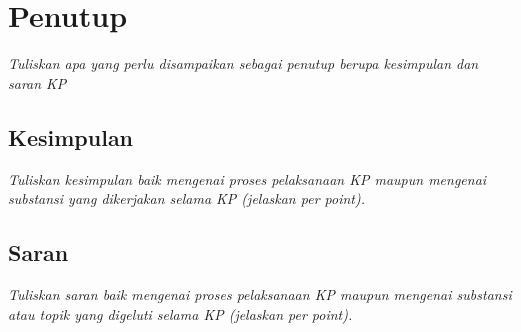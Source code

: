 \chapter{Penutup}
\textit{Tuliskan apa yang perlu disampaikan sebagai penutup berupa kesimpulan dan saran KP}

\section{Kesimpulan}
\textit{Tuliskan kesimpulan baik mengenai proses pelaksanaan KP maupun mengenai substansi yang dikerjakan selama KP (jelaskan per point).}

\section{Saran}
\textit{Tuliskan saran baik mengenai proses pelaksanaan KP maupun mengenai substansi atau topik yang digeluti selama KP (jelaskan per point).}